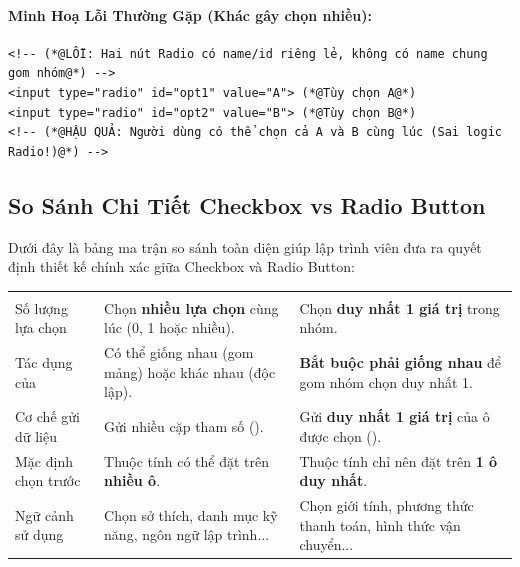 \paragraph{Minh Hoạ Lỗi Thường Gặp (Khác  gây chọn nhiều):}

\begin{codeWindow}
\begin{lstlisting}[language=HTML5]
<!-- (*@LỖI: Hai nút Radio có name/id riêng lẻ, không có name chung gom nhóm@*) -->
<input type="radio" id="opt1" value="A"> (*@Tùy chọn A@*)  
<input type="radio" id="opt2" value="B"> (*@Tùy chọn B@*)  
<!-- (*@HẬU QUẢ: Người dùng có thể chọn cả A và B cùng lúc (Sai logic Radio!)@*) -->
\end{lstlisting}
\end{codeWindow}

\subsection{So Sánh Chi Tiết Checkbox vs Radio Button}

Dưới đây là bảng ma trận so sánh toàn diện giúp lập trình viên đưa ra quyết định thiết kế chính xác giữa Checkbox và Radio Button:

\begin{prettyTableBox}
\begin{tabularx}{\linewidth}{K{2.8cm} Z Z}
 &  &  \\
Số lượng lựa chọn & Chọn \textbf{nhiều lựa chọn} cùng lúc (0, 1 hoặc nhiều). & Chọn \textbf{duy nhất 1 giá trị} trong nhóm. \\
Tác dụng của  & Có thể giống nhau (gom mảng) hoặc khác nhau (độc lập). & \textbf{Bắt buộc phải giống nhau} để gom nhóm chọn duy nhất 1. \\
Cơ chế gửi dữ liệu & Gửi nhiều cặp tham số (). & Gửi \textbf{duy nhất 1 giá trị} của ô được chọn (). \\
Mặc định chọn trước & Thuộc tính  có thể đặt trên \textbf{nhiều ô}. & Thuộc tính  chỉ nên đặt trên \textbf{1 ô duy nhất}. \\
Ngữ cảnh sử dụng & Chọn sở thích, danh mục kỹ năng, ngôn ngữ lập trình... & Chọn giới tính, phương thức thanh toán, hình thức vận chuyển... \\
\end{tabularx}
\end{prettyTableBox}

